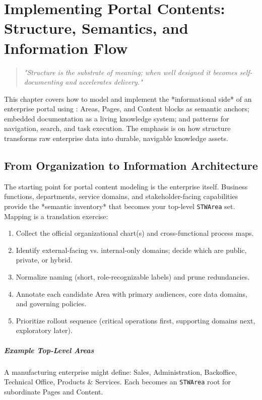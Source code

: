 \chapter{Implementing Portal Contents: Structure, Semantics, and Information Flow}
\label{chap:portal-contents}

\begin{quote}
\textit{"Structure is the substrate of meaning; when well designed it becomes self-documenting and accelerates delivery."}
\end{quote}

This chapter covers how to model and implement the *informational side* of an enterprise portal using \wbol{}: Areas, Pages, and Content blocks as semantic anchors; embedded documentation as a living knowledge system; and patterns for navigation, search, and task execution. The emphasis is on how structure transforms raw enterprise data into durable, navigable knowledge assets.

\section{From Organization to Information Architecture}
\label{sec:contents-org-to-ia}
The starting point for portal content modeling is the enterprise itself. Business functions, departments, service domains, and stakeholder-facing capabilities provide the *semantic inventory* that becomes your top-level \texttt{STWArea} set. Mapping is a translation exercise:
\begin{enumerate}
	\item Collect the official organizational chart(s) and cross-functional process maps.
	\item Identify external-facing vs. internal-only domains; decide which are public, private, or hybrid.
	\item Normalize naming (short, role-recognizable labels) and prune redundancies.
	\item Annotate each candidate Area with primary audiences, core data domains, and governing policies.
	\item Prioritize rollout sequence (critical operations first, supporting domains next, exploratory later).
\end{enumerate}
\paragraph{Example Top-Level Areas} A manufacturing enterprise might define: Sales, Administration, Backoffice, Technical Office, Products \& Services. Each becomes an \texttt{STWArea} root for subordinate Pages and Content.

